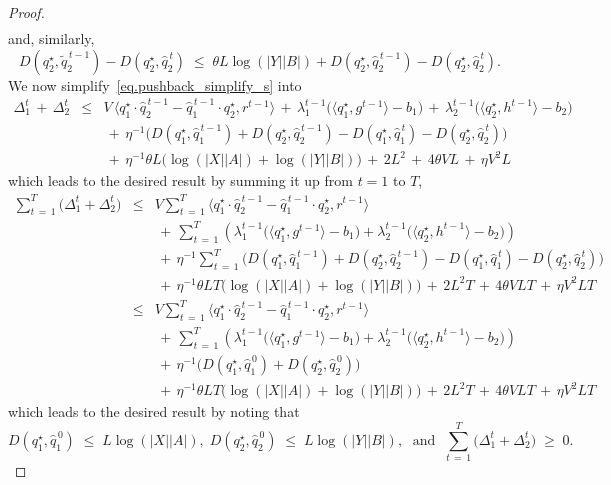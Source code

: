 \documentclass[12pt, final]{l4dc2023}
\begin{document}
\begin{proof}
\[\begin{array}{rcl}
	\end{array}
	\]
	and, similarly, 
	\[
	D( q_2^\star, \tilde q_2^{\,t-1})  - D( q_2^\star, \hat q_2^{\,t}) \;\leq\; \theta L\log (|Y||B|)+ D( q_2^\star,\hat q_2^{\,t-1}) - D( q_2^\star,\hat q_2^{\,t}). 
	\]
	We now simplify~\eqref{eq.pushback_simplify_s} into
	\[
	\begin{array}{rcl}
	\Delta_1^{t}  \,+\, \Delta_2^{t}
	&\leq&  V\, \big\langle{ q_1^\star\cdot \hat q_2^{\,t-1}-\hat q_1^{\,t-1}\cdot  q_2^\star },{r^{t-1}}\big\rangle 
	\,+\,
	\lambda_1^{t-1} \big(\langle{ q_1^\star},{g^{t-1}}\rangle 
	-b_1\big)
	\,+\,
	\lambda_2^{t-1} \big( \langle{ q_2^\star},{h^{t-1}}\rangle -b_2\big)
	\\[0.2cm]
	&& \,+\, \eta^{-1} \big(D( q_1^\star,\hat q_1^{\,t-1}) + D( q_2^\star, \hat q_2^{\,t-1}) -D( q_1^\star,\hat q_1^{\,t}) - D( q_2^\star, \hat q_2^{\,t}) \big)
	\\[0.2cm]
	&& \,+\, \eta^{-1}\theta L \big(\log (|X||A|) +\log (|Y||B|)\big)\,+\,2L^2 \,+\,4\theta V L\,+\,\eta V^2 L
	\end{array}
	\]
	which leads to the desired result by summing it up from $t=1$ to $T$,
	\[
	\begin{array}{rcl}
	\displaystyle
	\sum_{t\,=\,1}^{T} \big(\Delta_1^{t} + \Delta_2^{t}  \big)
	&\leq& \displaystyle V\sum_{t\,=\,1}^{T} \big\langle{ q_1^\star\cdot \hat q_2^{\,t-1}-\hat q_1^{\,t-1}\cdot  q_2^\star },{r^{t-1}}\big\rangle 
	\\[0.2cm]
	&& \displaystyle
	\,+\,\sum_{t\,=\,1}^{T}
	\left( \lambda_1^{t-1} \big(\langle{ q_1^\star},{g^{t-1}}\rangle 
	-b_1\big) + \lambda_2^{t-1} \big( \langle{ q_2^\star},{h^{t-1}}\rangle-b_2\big) \right)
	\\[0.2cm]
	&& \displaystyle\,+\, \eta^{-1} \sum_{t\,=\,1}^{T}\big(D( q_1^\star,\hat q_1^{\,t-1}) + D( q_2^\star, \hat q_2^{\,t-1}) -D( q_1^\star,\hat q_1^{\,t}) - D( q_2^\star, \hat q_2^{\,t}) \big)
	\\[0.2cm]
	&&\displaystyle \,+\, \eta^{-1}\theta L T\big(\log (|X||A|) +\log (|Y||B|)\big)\,+\,2L^2 T\,+\,4\theta V LT\,+\,\eta V^2 LT
	\\[0.2cm]
	&\leq& \displaystyle V\sum_{t\,=\,1}^{T} \big\langle{ q_1^\star\cdot \hat q_2^{\,t-1}-\hat q_1^{\,t-1}\cdot  q_2^\star },{r^{t-1}}\big\rangle 
	\\[0.2cm]
	&&\displaystyle
	\,+\,\sum_{t\,=\,1}^{T}
	\left(
	\lambda_1^{t-1} \big(\langle{ q_1^\star},{g^{t-1}}\rangle 
	-b_1\big)
	+	
	\lambda_2^{t-1}\big( \langle{ q_2^\star},{h^{t-1}}\rangle -b_2\big)
	\right)
	\\[0.2cm]
	&& \displaystyle\,+\, \eta^{-1} \big(D( q_1^\star,\hat q_1^{\,0}) + D( q_2^\star, \hat q_2^{\,0}) \big)
	\\[0.2cm]
	&&\displaystyle \,+\, \eta^{-1}\theta L T\big(\log (|X||A|) +\log (|Y||B|)\big)\,+\,2L^2 T\,+\,4\theta V LT\,+\,\eta V^2 LT
	\end{array}
	\]
	which leads to the desired result by noting that 
	\[
	D( q_1^\star,\hat q_1^{\,0})\;\leq\; L\log(|X||A|), \; D( q_2^\star, \hat q_2^{\,0}) \;\leq\; L\log(|Y||B|), \; \text{ and } \; \sum_{t\,=\,1}^{T}\big( \Delta_1^{t}+\Delta_2^{t} \big)  \; \geq \; 0. 
	\]
\end{proof}
\end{document}
